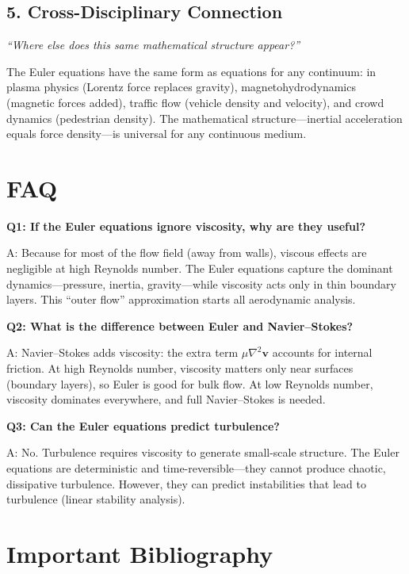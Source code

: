 \subsection*{5. Cross-Disciplinary Connection}
\textit{``Where else does this same mathematical structure appear?''}

The Euler equations have the same form as equations for any continuum: in plasma physics (Lorentz force replaces gravity), magnetohydrodynamics (magnetic forces added), traffic flow (vehicle density and velocity), and crowd dynamics (pedestrian density). The mathematical structure---inertial acceleration equals force density---is universal for any continuous medium.


\section*{FAQ}

\textbf{Q1: If the Euler equations ignore viscosity, why are they useful?}

A: Because for most of the flow field (away from walls), viscous effects are negligible at high Reynolds number. The Euler equations capture the dominant dynamics---pressure, inertia, gravity---while viscosity acts only in thin boundary layers. This ``outer flow'' approximation starts all aerodynamic analysis.

\textbf{Q2: What is the difference between Euler and Navier--Stokes?}

A: Navier--Stokes adds viscosity: the extra term $\mu \nabla^2 \mathbf{v}$ accounts for internal friction. At high Reynolds number, viscosity matters only near surfaces (boundary layers), so Euler is good for bulk flow. At low Reynolds number, viscosity dominates everywhere, and full Navier--Stokes is needed.

\textbf{Q3: Can the Euler equations predict turbulence?}

A: No. Turbulence requires viscosity to generate small-scale structure. The Euler equations are deterministic and time-reversible---they cannot produce chaotic, dissipative turbulence. However, they can predict instabilities that lead to turbulence (linear stability analysis).
\section*{Important Bibliography}

